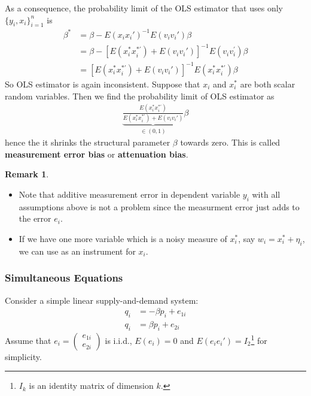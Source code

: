 \documentclass[11pt]{article} %
\theoremstyle{definition}
\numberwithin{defn}{subsection}
\numberwithin{thm}{subsection}
\newtheorem*{rmk}{Remark}
\numberwithin{ex}{subsection}
\begin{document}
As a consequence, the probability limit of the OLS estimator that uses only $\{y_i,x_i\}_{i=1}^n$ is
\begin{align*}
\beta^* &=\beta-E(x_ix_i')^{-1}E(v_iv_i')\beta\\
&=\beta-[E(x_i^*x_i^{* \prime}) +E(v_iv_i')]^{-1}E(v_iv_i^{\prime})\beta\tag*{: $x_i^*,v_i$ independent}\\
&=[E(x_i^*x_i^{*\prime})+E(v_iv_i')]^{-1}E(x_i^*x_i^{*\prime})\beta
\end{align*}
So OLS estimator is again inconsistent. Suppose that $x_i$ and $x_i^*$ are both scalar random variables. Then we find the probability limit of OLS estimator as
\begin{align*}
\underbrace{\frac{E(x_i^*x_i^{*\prime})}{E(x_i^*x_i^{*\prime})+E(v_iv_i')}}_{\in(0,1)}\beta
\end{align*}
hence the it shrinks the structural parameter $\beta$ towards zero. This is called \textbf{measurement error bias} or \textbf{attenuation bias}.

\begin{rmk}\leavevmode
	\begin{itemize}
		\item Note that additive measurement error in dependent variable $y_i$ with all assumptions above is not a problem since the measurment error just adds to the error $e_i$.
		\item If we have one more variable which is a noisy measure of $x_i^*$, say $w_i=x_i^*+\eta_i$, we can use as an instrument for $x_i$.
	\end{itemize}
\end{rmk}

\subsubsection{Simultaneous Equations}
Consider a simple linear supply-and-demand system:
\begin{align*}
q_i&=-\beta p_i+e_{1i}\tag*{: demand}\\
q_i&=\beta p_i+e_{2i}\tag*{: supply}
\end{align*}
Assume that $e_i=\begin{pmatrix}e_{1i}\\e_{2i}\end{pmatrix}$ is i.i.d., $E(e_i)=0$ and $E(e_ie_i')=I_2$\footnote{$I_k$ is an identity matrix of dimension $k$.} for simplicity.
\end{document}
